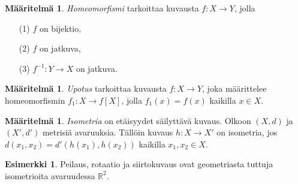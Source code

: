 \documentclass[12pt,a4paper,leqno]{report}
\newcommand{\R}{\mathbb{R}}
\theoremstyle{plain}
\newtheorem{lem}[equation]{Lemma}
\theoremstyle{definition}
\newtheorem{maar}[equation]{Määritelmä}
\newtheorem{esim}[equation]{Esimerkki}
\theoremstyle{remark}
\begin{document}
\begin{maar} \emph{Homeomorfismi} 
tarkoittaa kuvausta $f\colon X\rightarrow Y$, jolla 
\begin{itemize}
\item[(1)] $f$ on bijektio,
\item[(2)] $f$ on jatkuva,
\item[(3)] $f^{-1} \colon Y\rightarrow X$ on jatkuva. 
\end{itemize}
\end{maar}

\begin{maar}\emph{Upotus} 
tarkoittaa kuvausta $f\colon X\rightarrow Y$, joka määrittelee homeomorfismin $f_1\colon X\rightarrow f[X]$, jolla $f_1(x)=f(x)$ kaikilla $x\in X$. %
\end{maar}
\begin{maar}\emph{Isometria}
 on etäisyydet säilyttävä kuvaus. Olkoon $(X,d)$ ja $(X',d')$ metrisiä avaruuksia. %
Tällöin kuvaus $h\colon X\rightarrow X'$ on isometria, jos $d(x_1,x_2)=d'(h(x_1),h(x_2))$ kaikilla $x_1,x_2 \in X$.
\end{maar}
%
\begin{esim}
Peilaus, rotaatio ja siirtokuvaus ovat geometriasta tuttuja isometrioita avaruudessa $\R^2$.
\end{esim}
\end{document}
